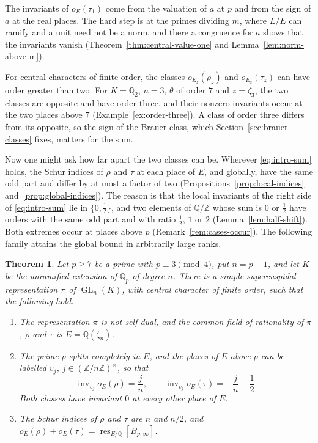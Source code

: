 \documentclass[a4paper,11pt]{amsart}
\newtheorem{introtheorem}{Theorem}
\theoremstyle{definition}
\theoremstyle{remark}
\numberwithin{equation}{section}
\newcommand{\Q}{\mathbb{Q}}
\newcommand{\Z}{\mathbb{Z}}
\DeclareMathOperator{\inv}{inv}
\DeclareMathOperator{\res}{res}
\DeclareMathOperator{\GL}{GL}
\newcommand{\Bpinf}{B_{p,\infty}}
\begin{document}
The invariants of $o_E(\tau_1)$ come from the valuation of $a$ at $p$ and from the sign of $a$ at the real places. The hard step is at the primes dividing $m$, where $L/E$ can ramify and a unit need not be a norm, and there a congruence for $a$ shows that the invariants vanish (Theorem~\ref{thm:central-value-one} and Lemma~\ref{lem:norm-above-m}).

For central characters of finite order, the classes $o_{E_z}(\rho_z)$ and $o_{E_z}(\tau_z)$ can have order greater than two. For $K=\Q_2$, $n=3$, $\theta$ of order $7$ and $z=\zeta_3$, the two classes are opposite and have order three, and their nonzero invariants occur at the two places above $7$ (Example~\ref{ex:order-three}). A class of order three differs from its opposite, so the sign of the Brauer class, which Section~\ref{sec:brauer-classes} fixes, matters for the sum.

Now one might ask how far apart the two classes can be. Wherever \eqref{eq:intro-sum} holds, the Schur indices of $\rho$ and $\tau$ at each place of $E$, and globally, have the same odd part and differ by at most a factor of two (Propositions~\ref{prop:local-indices} and~\ref{prop:global-indices}). The reason is that the local invariants of the right side of \eqref{eq:intro-sum} lie in $\{0,\frac12\}$, and two elements of $\Q/\Z$ whose sum is $0$ or $\frac12$ have orders with the same odd part and with ratio $\frac12$, $1$ or $2$ (Lemma~\ref{lem:half-shift}). Both extremes occur at places above $p$ (Remark~\ref{rem:cases-occur}). The following family attains the global bound in arbitrarily large ranks.

\begin{introtheorem}\label{thm:intro-family}
Let $p\ge7$ be a prime with $p\equiv3\pmod4$, put $n=p-1$, and let $K$ be the unramified extension of $\Q_p$ of degree $n$. There is a simple supercuspidal representation $\pi$ of $\GL_n(K)$, with central character of finite order, such that the following hold.
\begin{enumerate}
\item[(i)] The representation $\pi$ is not self-dual, and the common field of rationality of $\pi$, $\rho$ and $\tau$ is $E=\Q(\zeta_n)$.
\item[(ii)] The prime $p$ splits completely in $E$, and the places of $E$ above $p$ can be labelled $v_j$, $j\in(\Z/n\Z)^\times$, so that
\[
 \inv_{v_j}o_E(\rho)=\frac jn,\qquad \inv_{v_j}o_E(\tau)=-\frac jn-\frac12.
\]
Both classes have invariant $0$ at every other place of $E$.
\item[(iii)] The Schur indices of $\rho$ and $\tau$ are $n$ and $n/2$, and $o_E(\rho)+o_E(\tau)=\res_{E/\Q}[\Bpinf]$.
\end{enumerate}
\end{introtheorem}
\end{document}
